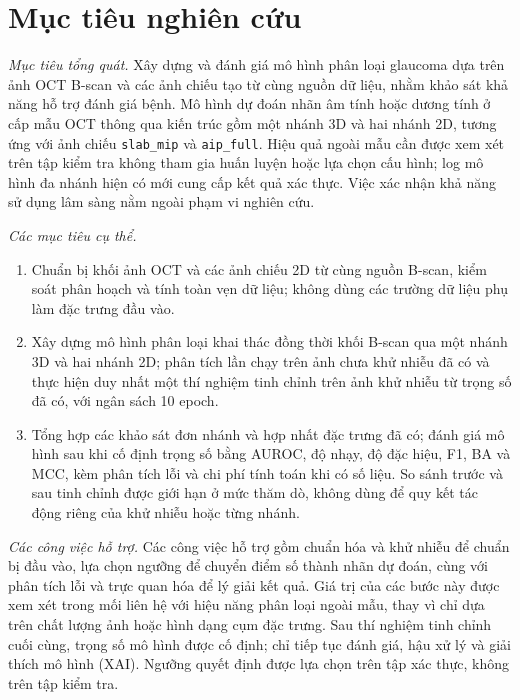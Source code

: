 \documentclass[14pt,a4paper,oneside]{extreport}
\begin{document}
\section{Mục tiêu nghiên cứu}
\textit{Mục tiêu tổng quát.}
Xây dựng và đánh giá mô hình phân loại glaucoma
dựa trên ảnh OCT B-scan và các ảnh chiếu tạo từ cùng nguồn dữ liệu,
nhằm khảo sát khả năng hỗ trợ đánh giá bệnh. Mô hình dự đoán nhãn âm tính
hoặc dương tính ở cấp mẫu OCT thông qua kiến trúc gồm một nhánh 3D
và hai nhánh 2D, tương ứng với ảnh chiếu \texttt{slab\_mip} và
\texttt{aip\_full}. Hiệu quả ngoài mẫu cần được xem xét trên tập kiểm tra
không tham gia huấn luyện hoặc lựa chọn cấu hình; log mô hình đa nhánh
hiện có mới cung cấp kết quả xác thực. Việc xác nhận khả năng sử dụng
lâm sàng nằm ngoài phạm vi nghiên cứu.

\textit{Các mục tiêu cụ thể.}
\begin{enumerate}[label=\arabic*.,leftmargin=1cm]
  \item Chuẩn bị khối ảnh OCT và các ảnh chiếu 2D từ cùng nguồn
  B-scan, kiểm soát phân hoạch và tính toàn vẹn dữ liệu; không dùng
  các trường dữ liệu phụ làm đặc trưng đầu vào.
  \item Xây dựng mô hình phân loại khai thác đồng thời khối B-scan
  qua một nhánh 3D và hai nhánh 2D; phân tích lần chạy trên ảnh chưa
  khử nhiễu đã có và thực hiện duy nhất một thí nghiệm tinh chỉnh trên
  ảnh khử nhiễu từ trọng số đã có, với ngân sách 10 epoch.
  \item Tổng hợp các khảo sát đơn nhánh và hợp nhất đặc trưng đã có;
  đánh giá mô hình sau khi cố định trọng số bằng AUROC, độ nhạy, độ
  đặc hiệu, F1, BA và MCC, kèm phân tích lỗi và chi phí tính toán khi
  có số liệu. So sánh trước và sau tinh chỉnh được giới hạn ở mức thăm dò,
  không dùng để quy kết tác động riêng của khử nhiễu hoặc từng nhánh.
\end{enumerate}
\textit{Các công việc hỗ trợ.}
Các công việc hỗ trợ gồm chuẩn hóa và khử nhiễu để chuẩn bị đầu vào,
lựa chọn ngưỡng để chuyển điểm số thành nhãn dự đoán, cùng với phân
tích lỗi và trực quan hóa để lý giải kết quả. Giá trị của các
bước này được xem xét trong mối liên hệ với hiệu năng phân loại
ngoài mẫu, thay vì chỉ dựa trên chất lượng ảnh hoặc hình dạng cụm
đặc trưng. Sau thí nghiệm tinh chỉnh cuối cùng, trọng số mô hình được
cố định; chỉ tiếp tục đánh giá, hậu xử lý và giải thích mô hình (XAI).
Ngưỡng quyết định được lựa chọn trên tập xác thực, không trên tập kiểm tra.
\end{document}
